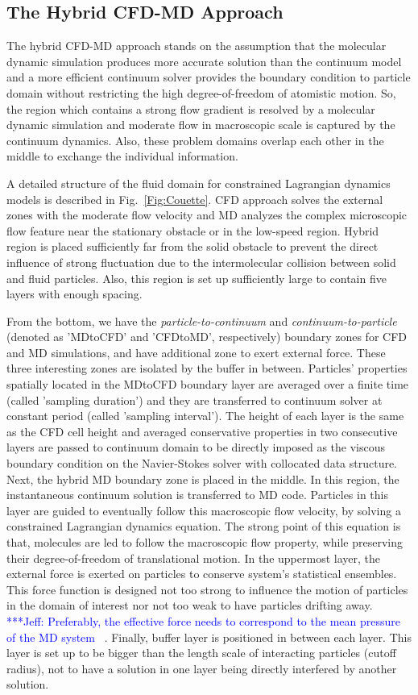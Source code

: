 \documentclass[preprint,12pt]{elsarticle}
\newcommand{\skonote}[1]{ {\textcolor{blue} { ***Jeff: #1 }}}
\newcommand{\skonote}[1]{}
\begin{document}
\subsection{The Hybrid CFD-MD Approach}
The hybrid CFD-MD approach stands on the assumption that the molecular dynamic simulation produces more accurate solution than the continuum model and a more efficient continuum solver provides the boundary condition to particle domain without restricting the high degree-of-freedom of atomistic motion. So, the region which contains a strong flow gradient is resolved by a molecular dynamic simulation and moderate flow in macroscopic scale is captured by the continuum dynamics. Also, these problem domains overlap each other in the middle to exchange the individual information.

A detailed structure of the fluid domain for constrained Lagrangian dynamics models is described in Fig.~\ref{Fig:Couette}. CFD approach solves the external zones with the moderate flow velocity and MD analyzes the complex microscopic flow feature near the stationary obstacle or in the low-speed region. Hybrid region is placed sufficiently far from the solid obstacle to prevent the direct influence of strong fluctuation due to the intermolecular collision between solid and fluid particles. Also, this region is set up sufficiently large to contain five layers with enough spacing.

From the bottom, we have the {\it{particle-to-continuum}} and {\it{continuum-to-particle}} (denoted as 'MDtoCFD' and 'CFDtoMD', respectively) boundary zones for CFD and MD simulations, and have additional zone to exert external force. These three interesting zones are isolated by the buffer in between.
Particles' properties spatially located in the MDtoCFD boundary layer are averaged over a finite time (called 'sampling duration') and they are transferred to continuum solver at constant period (called 'sampling interval'). The height of each layer is the same as the CFD cell height and averaged conservative properties in two consecutive layers are passed to continuum domain to be directly imposed as the viscous boundary condition on the Navier-Stokes solver with collocated data structure.
Next, the hybrid MD boundary zone is placed in the middle. In this region, the instantaneous continuum solution is transferred to MD code. Particles in this layer are guided to eventually follow this macroscopic flow velocity, by solving a constrained Lagrangian dynamics equation. The strong point of this equation is that, molecules are led to follow the macroscopic flow property, while preserving their degree-of-freedom of translational motion.
In the uppermost layer, the external force is exerted on particles to conserve system's statistical ensembles. This force function is designed not too strong to influence the motion of particles in the domain of interest nor not too weak to have particles drifting away. \skonote{Preferably, the effective force needs to correspond to the mean pressure of the MD system~\cite{Werder}}. Finally, buffer layer is positioned in between each layer. This layer is set up to be bigger than the length scale of interacting particles (cutoff radius), not to have a solution in one layer being directly interfered by another solution.
\end{document}

